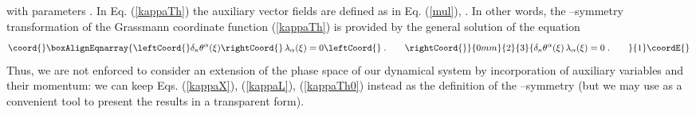 \documentclass[a4paper,11pt]{article}
\begin{document}
with parameters \coordHE{}. 
In Eq. (\ref{kappaTh}) the \coordHE{} auxiliary  
\coordHE{} vector fields  \coordHE{} are defined as in  Eq. (\ref{mul}), 
\coordHE{}.
In other words, 
the \myHighlight{$\kappa$}\coordHE{}--symmetry transformation of 
the Grassmann  coordinate function (\ref{kappaTh}) is provided by the 
general solution of the equation
\begin{eqnarray}\coord{}\boxAlignEqnarray{\leftCoord{}
\label{kappaTh0} 
\delta_{\kappa} \theta^{\alpha}(\xi)\rightCoord{}\, \lambda_{\alpha}(\xi) =0
\leftCoord{}\; . \qquad 
\rightCoord{}}{0mm}{2}{3}{
\delta_{\kappa} \theta^{\alpha}(\xi)\, \lambda_{\alpha}(\xi) =0
\; . \qquad 
}{1}\coordE{}\end{eqnarray}
Thus, we are not enforced to consider an extension of the phase space of our 
dynamical system by incorporation of auxiliary variables 
\coordHE{} and their momentum: we     
can keep Eqs. (\ref{kappaX}), (\ref{kappaL}), 
(\ref{kappaTh0}) instead as the definition of the \myHighlight{$\kappa$}\coordHE{}--symmetry 
(but we may use \coordHE{} as a convenient tool 
to present the results in  a transparent form).  
\end{document}

